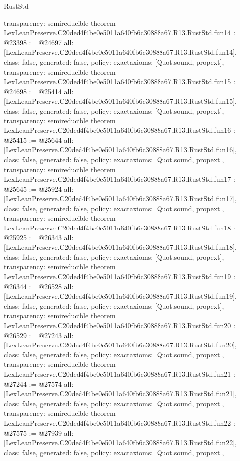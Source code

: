\begin{lexlean}{RustStd}
\begin{coremodule}
{  transparency: semireducible
}
theorem LexLeanPreserve.C20ded4f4be0e5011a640fb6c30888a67.R13.RustStd.fun14 : @23398 := @24697 {
  all: [LexLeanPreserve.C20ded4f4be0e5011a640fb6c30888a67.R13.RustStd.fun14],
  class: false,
  generated: false,
  policy: exact{axioms: [Quot.sound, propext]},
  transparency: semireducible
}
theorem LexLeanPreserve.C20ded4f4be0e5011a640fb6c30888a67.R13.RustStd.fun15 : @24698 := @25414 {
  all: [LexLeanPreserve.C20ded4f4be0e5011a640fb6c30888a67.R13.RustStd.fun15],
  class: false,
  generated: false,
  policy: exact{axioms: [Quot.sound, propext]},
  transparency: semireducible
}
theorem LexLeanPreserve.C20ded4f4be0e5011a640fb6c30888a67.R13.RustStd.fun16 : @25415 := @25644 {
  all: [LexLeanPreserve.C20ded4f4be0e5011a640fb6c30888a67.R13.RustStd.fun16],
  class: false,
  generated: false,
  policy: exact{axioms: [Quot.sound, propext]},
  transparency: semireducible
}
theorem LexLeanPreserve.C20ded4f4be0e5011a640fb6c30888a67.R13.RustStd.fun17 : @25645 := @25924 {
  all: [LexLeanPreserve.C20ded4f4be0e5011a640fb6c30888a67.R13.RustStd.fun17],
  class: false,
  generated: false,
  policy: exact{axioms: [Quot.sound, propext]},
  transparency: semireducible
}
theorem LexLeanPreserve.C20ded4f4be0e5011a640fb6c30888a67.R13.RustStd.fun18 : @25925 := @26343 {
  all: [LexLeanPreserve.C20ded4f4be0e5011a640fb6c30888a67.R13.RustStd.fun18],
  class: false,
  generated: false,
  policy: exact{axioms: [Quot.sound, propext]},
  transparency: semireducible
}
theorem LexLeanPreserve.C20ded4f4be0e5011a640fb6c30888a67.R13.RustStd.fun19 : @26344 := @26528 {
  all: [LexLeanPreserve.C20ded4f4be0e5011a640fb6c30888a67.R13.RustStd.fun19],
  class: false,
  generated: false,
  policy: exact{axioms: [Quot.sound, propext]},
  transparency: semireducible
}
theorem LexLeanPreserve.C20ded4f4be0e5011a640fb6c30888a67.R13.RustStd.fun20 : @26529 := @27243 {
  all: [LexLeanPreserve.C20ded4f4be0e5011a640fb6c30888a67.R13.RustStd.fun20],
  class: false,
  generated: false,
  policy: exact{axioms: [Quot.sound, propext]},
  transparency: semireducible
}
theorem LexLeanPreserve.C20ded4f4be0e5011a640fb6c30888a67.R13.RustStd.fun21 : @27244 := @27574 {
  all: [LexLeanPreserve.C20ded4f4be0e5011a640fb6c30888a67.R13.RustStd.fun21],
  class: false,
  generated: false,
  policy: exact{axioms: [Quot.sound, propext]},
  transparency: semireducible
}
theorem LexLeanPreserve.C20ded4f4be0e5011a640fb6c30888a67.R13.RustStd.fun22 : @27575 := @27939 {
  all: [LexLeanPreserve.C20ded4f4be0e5011a640fb6c30888a67.R13.RustStd.fun22],
  class: false,
  generated: false,
  policy: exact{axioms: [Quot.sound, propext]},
}
\end{coremodule}
\end{lexlean}

